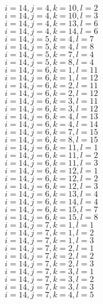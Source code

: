 \documentclass[14pt]{article}
\begin{document}
    $i=14,j=4,k=10,l=2 $ \\ 
    $i=14,j=4,k=10,l=3 $ \\ 
    $i=14,j=4,k=13,l=6 $ \\ 
    $i=14,j=4,k=14,l=6 $ \\ 
    $i=14,j=5,k=4,l=7 $ \\ 
    $i=14,j=5,k=4,l=8 $ \\ 
    $i=14,j=5,k=7,l=4 $ \\ 
    $i=14,j=5,k=8,l=4 $ \\ 
    $i=14,j=6,k=1,l=11 $ \\ 
    $i=14,j=6,k=1,l=12 $ \\ 
    $i=14,j=6,k=2,l=11 $ \\ 
    $i=14,j=6,k=2,l=12 $ \\ 
    $i=14,j=6,k=3,l=11 $ \\ 
    $i=14,j=6,k=3,l=12 $ \\ 
    $i=14,j=6,k=4,l=13 $ \\ 
    $i=14,j=6,k=4,l=14 $ \\ 
    $i=14,j=6,k=7,l=15 $ \\ 
    $i=14,j=6,k=8,l=15 $ \\ 
    $i=14,j=6,k=11,l=1 $ \\ 
    $i=14,j=6,k=11,l=2 $ \\ 
    $i=14,j=6,k=11,l=3 $ \\ 
    $i=14,j=6,k=12,l=1 $ \\ 
    $i=14,j=6,k=12,l=2 $ \\ 
    $i=14,j=6,k=12,l=3 $ \\ 
    $i=14,j=6,k=13,l=4 $ \\ 
    $i=14,j=6,k=14,l=4 $ \\ 
    $i=14,j=6,k=15,l=7 $ \\ 
    $i=14,j=6,k=15,l=8 $ \\ 
    $i=14,j=7,k=1,l=1 $ \\ 
    $i=14,j=7,k=1,l=2 $ \\ 
    $i=14,j=7,k=1,l=3 $ \\ 
    $i=14,j=7,k=2,l=1 $ \\ 
    $i=14,j=7,k=2,l=2 $ \\ 
    $i=14,j=7,k=2,l=3 $ \\ 
    $i=14,j=7,k=3,l=1 $ \\ 
    $i=14,j=7,k=3,l=2 $ \\ 
    $i=14,j=7,k=3,l=3 $ \\ 
    $i=14,j=7,k=4,l=5 $ \\ 
\end{document}
